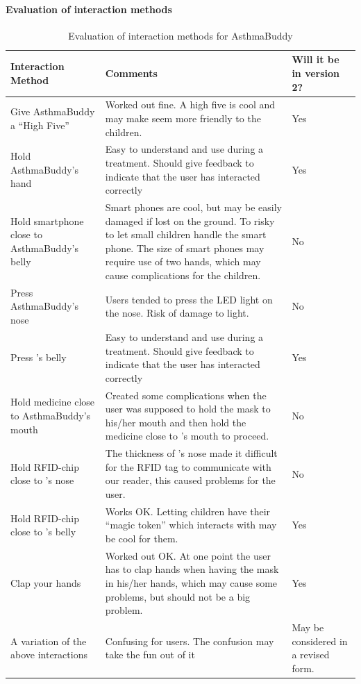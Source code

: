 \paragraph{Evaluation of interaction methods}
\label{chp:interaction-methods}
\begin{table}[H]
\begin{tabular}{|p{5.0cm} | p{6.0cm} | p{3.0cm} |}
\hline 
\textbf{Interaction Method} & \textbf{Comments} & \textbf{Will it be in version 2?}\\
\hline
	Give AsthmaBuddy a ``High Five'' & Worked out fine. A high five is cool and may make \ab{} seem more friendly to the children. & Yes \\
\hline
	Hold AsthmaBuddy's hand & Easy to understand and use during a treatment. Should give feedback to indicate that the user has interacted correctly & Yes\\
\hline
	Hold smartphone close to AsthmaBuddy's belly & Smart phones are cool, but may be easily damaged if lost on the ground. To risky to let small children handle the smart phone. The size of smart phones may require use of two hands, which may cause complications for the children. & No \\
\hline
	Press AsthmaBuddy's nose & Users tended to press the LED light on the nose. Risk of damage to light. & No\\
\hline
	Press \buddy{}'s belly & Easy to understand and use during a treatment. Should give feedback to indicate that the user has interacted correctly & Yes\\
\hline
	Hold medicine close to AsthmaBuddy's mouth & Created some complications when the user was supposed to hold the mask to his/her mouth and then hold the medicine close to \ab{}'s mouth to proceed. & No \\
\hline
	Hold RFID-chip close to \buddy{}'s nose & The thickness of \buddy{}'s nose made it difficult for the RFID tag to communicate with our reader, this caused problems for the user. & No \\
\hline
	Hold RFID-chip close to \buddy{}'s belly & Works OK. Letting children have their ``magic token'' which interacts with \ab{} may be cool for them. & Yes\\
\hline
	Clap your hands & Worked out OK. At one point the user has to clap hands when having the mask in his/her hands, which may cause some problems, but should not be a big problem. & Yes\\
\hline
	A variation of the above interactions & Confusing for users. The confusion may take the fun out of it & May be considered in a revised form.\\
\hline
\end{tabular}
\caption{Evaluation of interaction methods for AsthmaBuddy}
\label{tab:interactioneval}
\end{table}

